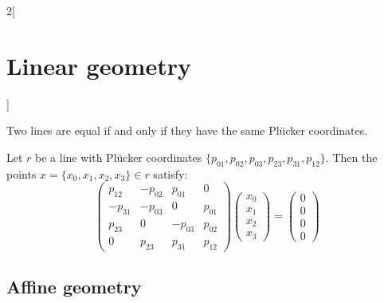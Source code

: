 \documentclass[../../../main.tex]{subfiles}
\begin{document}
\begin{multicols}{2}[\section{Linear geometry}]
\begin{proposition}
  \end{proposition}
  \begin{proposition}
    Two lines are equal if and only if they have the same Plücker coordinates.
  \end{proposition}
  \begin{proposition}
    Let $r$ be a line with Plücker coordinates $\{p_{01},p_{02},p_{03},p_{23},p_{31},p_{12}\}$. Then the points $x=\{x_0,x_1,x_2,x_3\}\in r$ satisfy: $$\begin{pmatrix}
        p_{12}  & -p_{02} & p_{01}  & 0      \\
        -p_{31} & -p_{03} & 0       & p_{01} \\
        p_{23}  & 0       & -p_{03} & p_{02} \\
        0       & p_{23}  & p_{31}  & p_{12}
      \end{pmatrix}\begin{pmatrix}
        x_0 \\
        x_1 \\
        x_2 \\
        x_3
      \end{pmatrix}=\begin{pmatrix}
        0 \\
        0 \\
        0 \\
        0
      \end{pmatrix}$$
  \end{proposition}
  \subsection{Affine geometry}

\end{multicols}
\end{document}
